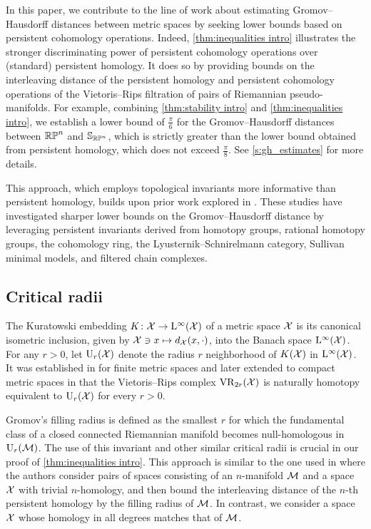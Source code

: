In this paper, we contribute to the line of work about estimating Gromov--Hausdorff distances between metric spaces by seeking lower bounds based on persistent cohomology operations.
Indeed, \cref{thm:inequalities intro} illustrates the stronger discriminating power of persistent cohomology operations over (standard) persistent homology.
It does so by providing bounds on the interleaving distance of the persistent homology and persistent cohomology operations of the Vietoris--Rips filtration of pairs of Riemannian pseudo-manifolds.
For example, combining \cref{thm:stability intro} and \cref{thm:inequalities intro}, we establish a lower bound of $\frac{\pi}{6}$ for the Gromov--Hausdorff distances between \(\mathbb{RP}^n\) and \(\mathbb{S}_{\mathbb{RP}^n}\), which is strictly greater than the lower bound obtained from persistent homology, which does not exceed $\frac{\pi}{8}$.
See \cref{s:gh_estimates} for more details.

This approach, which employs topological invariants more informative than persistent homology, builds upon prior work explored in \cite{zhou2023beyond, zhou2023persistent, memoli2024persistenthomotopy, memoli2024persistent, memoli2025ephemeral}.
These studies have investigated sharper lower bounds on the Gromov--Hausdorff distance by leveraging persistent invariants derived from homotopy groups, rational homotopy groups, the cohomology ring, the Lyusternik--Schnirelmann category, Sullivan minimal models, and filtered chain complexes.

\subsection*{Critical radii}

The Kuratowski embedding \(K \colon \mathcal{X} \to \mathrm{L}^\infty(\mathcal{X})\) of a metric space \(\mathcal{X}\) is its canonical isometric inclusion, given by \(\mathcal{X} \ni x \mapsto d_{\mathcal{X}}(x,\cdot)\), into the Banach space $\mathrm{L}^\infty(\mathcal{X})$.
For any $r>0$, let \(\mathrm{U}_r(\mathcal{X})\) denote the radius \(r\) neighborhood of \(K(\mathcal{X})\) in \(\mathrm{L}^\infty(\mathcal{X})\).
It was established in \cite{chazal2009gromov} for finite metric spaces and later extended to compact metric spaces in \cite{lim2024vietoris} that the Vietoris--Rips complex \(\mathrm{VR}_{2r}(\mathcal{X})\) is naturally homotopy equivalent to \(\mathrm{U}_r(\mathcal{X})\) for every \(r > 0\).

Gromov's filling radius is defined as the smallest \(r\) for which the fundamental class of a closed connected Riemannian manifold becomes null-homologous in \(\mathrm{U}_r(\mathcal{M})\).
The use of this invariant and other similar critical radii is crucial in our proof of \cref{thm:inequalities intro}.
This approach is similar to the one used in \cite[Prop.~9.38]{lim2024vietoris} where the authors consider pairs of spaces consisting of an $n$-manifold \(\mathcal{M}\) and a space \(\mathcal{X}\) with trivial \(n\)-homology, and then bound the interleaving distance of the \(n\)-th persistent homology by the filling radius of \(\mathcal{M}\).
In contrast, we consider a space \(\mathcal{X}\) whose homology in all degrees matches that of \(\mathcal{M}\).